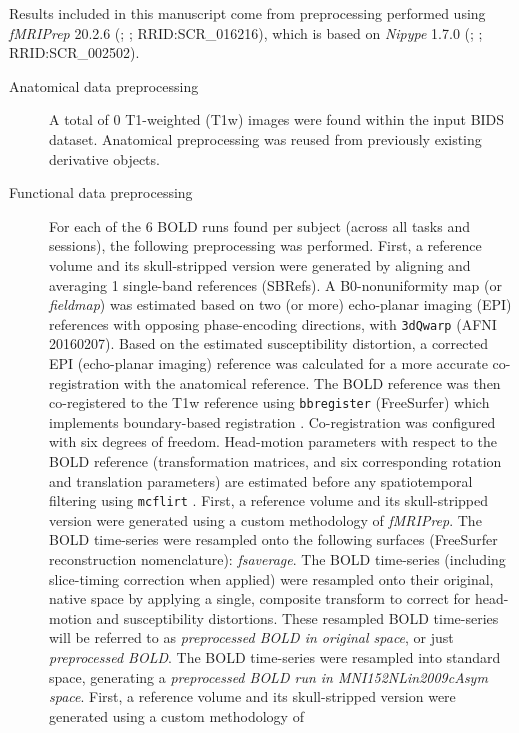 \documentclass[]{article}
\date{}
\begin{document}
Results included in this manuscript come from preprocessing performed
using \emph{fMRIPrep} 20.2.6 (\citet{fmriprep1}; \citet{fmriprep2};
RRID:SCR\_016216), which is based on \emph{Nipype} 1.7.0
(\citet{nipype1}; \citet{nipype2}; RRID:SCR\_002502).

\begin{description}
\item[Anatomical data preprocessing]
A total of 0 T1-weighted (T1w) images were found within the input BIDS
dataset. Anatomical preprocessing was reused from previously existing
derivative objects.
\item[Functional data preprocessing]
For each of the 6 BOLD runs found per subject (across all tasks and
sessions), the following preprocessing was performed. First, a reference
volume and its skull-stripped version were generated by aligning and
averaging 1 single-band references (SBRefs). A B0-nonuniformity map (or
\emph{fieldmap}) was estimated based on two (or more) echo-planar
imaging (EPI) references with opposing phase-encoding directions, with
\texttt{3dQwarp} \citet{afni} (AFNI 20160207). Based on the estimated
susceptibility distortion, a corrected EPI (echo-planar imaging)
reference was calculated for a more accurate co-registration with the
anatomical reference. The BOLD reference was then co-registered to the
T1w reference using \texttt{bbregister} (FreeSurfer) which implements
boundary-based registration \citep{bbr}. Co-registration was configured
with six degrees of freedom. Head-motion parameters with respect to the
BOLD reference (transformation matrices, and six corresponding rotation
and translation parameters) are estimated before any spatiotemporal
filtering using \texttt{mcflirt} \citep[FSL 5.0.9,][]{mcflirt}. First, a
reference volume and its skull-stripped version were generated using a
custom methodology of \emph{fMRIPrep}. The BOLD time-series were
resampled onto the following surfaces (FreeSurfer reconstruction
nomenclature): \emph{fsaverage}. The BOLD time-series (including
slice-timing correction when applied) were resampled onto their
original, native space by applying a single, composite transform to
correct for head-motion and susceptibility distortions. These resampled
BOLD time-series will be referred to as \emph{preprocessed BOLD in
original space}, or just \emph{preprocessed BOLD}. The BOLD time-series
were resampled into standard space, generating a \emph{preprocessed BOLD
run in MNI152NLin2009cAsym space}. First, a reference volume and its
skull-stripped version were generated using a custom methodology of

\end{description}
\end{document}

